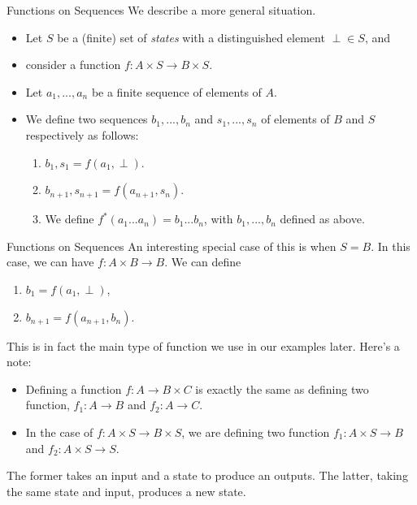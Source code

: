 \documentclass[10pt]{beamer}
\begin{document}
\begin{frame}{Functions on Sequences}
We describe a more general situation.

\begin{itemize}
\item  Let $S$ be a (finite) set of {\em states} with a distinguished element $\perp\in S$, and

\item  consider a function $f:A\times S\to B\times S$.

\item  Let $a_1, ..., a_n$ be a finite sequence of elements of $A$.

\item  We define two sequences $b_1, ..., b_n$ and $s_1, ..., s_n$ of elements of $B$ and $S$ respectively as follows:
\begin{enumerate}
\item $b_1, s_1 = f(a_1, \perp)$.

\item  %
 $b_{n+1}, s_{n+1} = f(a_{n+1}, s_n)$.
 \item We define $f^*(a_1...a_n)=b_1...b_n$, with $b_1, ..., b_n$ defined as above.
\end{enumerate}

%

\end{itemize}
\end{frame}

\begin{frame}{Functions on Sequences}
  An interesting special case of this is when $S=B$. In this case, we can have $f:A\times B\to B$. We can define
  \begin{enumerate}
    \item $b_1 = f(a_1, \perp)$,
    \item $b_{n+1}=f(a_{n+1}, b_n)$.
  \end{enumerate}

  This is in fact the main type of function we use in our examples later. Here's a note:
\begin{itemize}
  \item Defining a function $f:A\to B\times C$ is exactly the same as defining two function, $f_1:A\to B$ and $f_2:A\to C$.

  \item In the case of $f:A\times S\to B\times S$, we are defining two function $f_1:A\times S\to B$ and $f_2:A\times S\to S$.
\end{itemize}
  The former takes an input and a state to produce an outputs.  The latter, taking the same state and input, produces a new state.
\end{frame}
\end{document}
